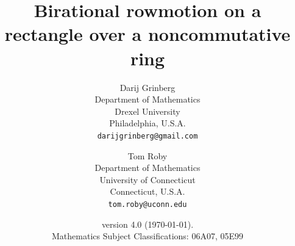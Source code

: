 \documentclass[numbers=enddot,12pt,final,onecolumn,notitlepage]{scrartcl}%
\theoremstyle{definition}
\begin{document}
\title{\textbf{Birational rowmotion on a rectangle over a noncommutative ring}}
\author{Darij Grinberg\\{\small Department of Mathematics}\\[-0.8ex] {\small Drexel University}\\[-0.8ex] {\small Philadelphia, U.S.A.}\\{\small \texttt{darijgrinberg@gmail.com}}\\\phantom {!}
\and Tom Roby\\{\small Department of Mathematics}\\[-0.8ex] {\small University of Connecticut}\\[-0.8ex] {\small Connecticut, U.S.A.}\\{\small \texttt{tom.roby@uconn.edu}}}
\date{version {4.0} (\today).\\
{\small Mathematics Subject Classifications: 06A07, 05E99}}
\maketitle
\end{document}
